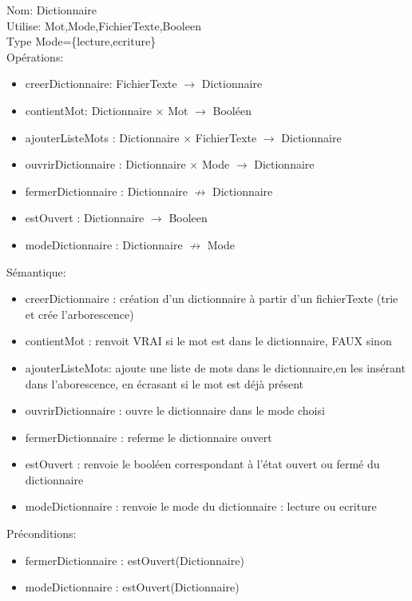 \documentclass{article}
\begin{document}
    \noindent
    Nom: Dictionnaire \\
    Utilise: Mot,Mode,FichierTexte,Booleen \\
    Type Mode=\{lecture,ecriture\}  \\
    Opérations: \begin{itemize}[label=$\ $, leftmargin=2cm, itemsep=0cm]
        \item creerDictionnaire: FichierTexte $\rightarrow $ Dictionnaire
        \item contientMot: Dictionnaire $\times$ Mot $\rightarrow $ Booléen
        \item ajouterListeMots : Dictionnaire $\times$ FichierTexte $ \rightarrow$ Dictionnaire
        \item ouvrirDictionnaire : Dictionnaire $\times$ Mode $ \rightarrow$ Dictionnaire
        \item fermerDictionnaire : Dictionnaire $ \nrightarrow$ Dictionnaire
        \item estOuvert : Dictionnaire $ \rightarrow$ Booleen
        \item modeDictionnaire : Dictionnaire $ \nrightarrow$ Mode
        
        
    \end{itemize}
    
    Sémantique: \begin{itemize}[label=$\- $, leftmargin=2cm, itemsep=0cm]
        \item creerDictionnaire : création d’un dictionnaire à partir d’un fichierTexte (trie et crée l'arborescence)
        \item contientMot : renvoit VRAI si le mot est dans le dictionnaire, FAUX sinon
        \item ajouterListeMots: ajoute une liste de mots dans le dictionnaire,en les insérant dans l'aborescence, en écrasant si le mot est déjà présent
        \item ouvrirDictionnaire : ouvre le dictionnaire dans le mode choisi
        \item fermerDictionnaire : referme le dictionnaire ouvert
        \item estOuvert : renvoie le booléen correspondant à l'état ouvert ou fermé du dictionnaire
        \item modeDictionnaire : renvoie le mode du dictionnaire : lecture ou ecriture
    \end{itemize}

    Préconditions: \begin{itemize}[label=$\- $, leftmargin=2cm, itemsep=0cm]
        \item fermerDictionnaire : estOuvert(Dictionnaire)
        \item modeDictionnaire : estOuvert(Dictionnaire)
    \end{itemize}
\end{document}
